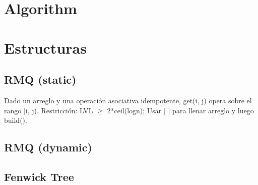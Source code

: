 

\def\title{El Diego 2.0}
\tableofcontents\newpage

 
\section{Algorithm}%



\section{Estructuras}%
\subsection{RMQ (static)}
Dado un arreglo y una operación asociativa idempotente, get(i, j) opera sobre el rango [i, j). Restricción: LVL $\ge$ 2*ceil(logn); Usar [ ] para llenar arreglo y luego build().
\subsection{RMQ (dynamic)}
\subsection{Fenwick Tree}
